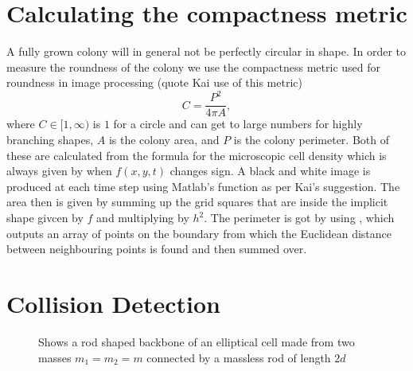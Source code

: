 \section{Calculating the compactness metric}
A fully grown colony will in general not be perfectly circular in shape.
 In order to measure the roundness of the colony we use the compactness metric used for 
 roundness in image processing (quote Kai use of this metric)
\begin{equation}
  C = \frac{P^2}{4 \pi A},
\end{equation}
where $C \in [1, \infty)$ is $1$ for a circle and can get to large numbers for 
highly branching shapes, $A$ is the colony area, and $P$ is the colony perimeter. 
Both of these are calculated from the formula for the microscopic cell
density which is always given by when $f(x,y,t)$ changes sign. A black and white image 
is produced at each time step using Matlab's function  as per
Kai's suggestion. The area then is given by summing up the grid squares that are
inside the implicit shape givcen by $f$ and multiplying by $h^2$. The perimeter
is got by using , which outputs an array of points on the boundary
from which the Euclidean distance between neighbouring points is found and then summed over.

\section{Collision Detection}

\begin{figure}
    \centering
    \caption{Shows a rod shaped backbone of an elliptical cell made from two masses $m_1 = m_2 = m$ connected by a massless rod of length $2d$}
    \label{fig:rod}
\end{figure}



